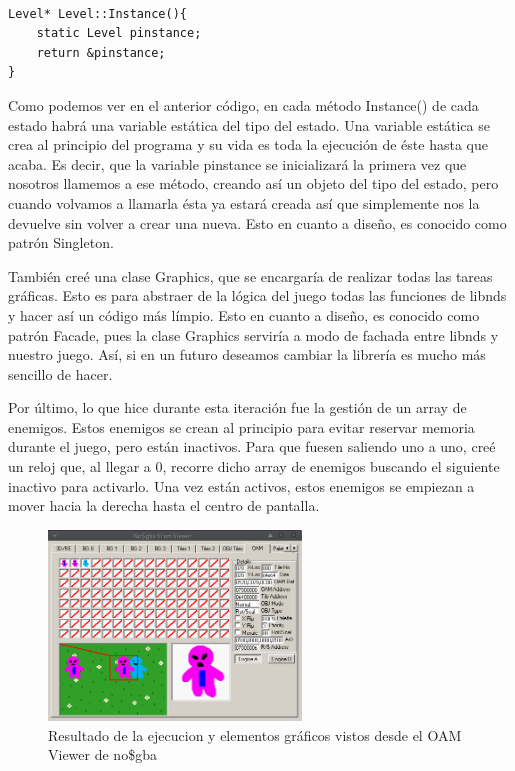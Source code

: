 \vspace{0.5cm}

\begin{lstlisting}[caption={Implementación del patrón Singleton}, label={code:singleton}]

Level* Level::Instance(){
	static Level pinstance;
	return &pinstance;
}

\end{lstlisting}

\vspace{0.5cm}

Como podemos ver en el anterior código, en cada método Instance() de cada estado habrá una variable estática del tipo del estado. Una variable estática se crea al principio del programa y su vida es toda la ejecución de éste hasta que acaba. Es decir, que la variable pinstance se inicializará la primera vez que nosotros llamemos a ese método, creando así un objeto del tipo del estado, pero cuando volvamos a llamarla ésta ya estará creada así que simplemente nos la devuelve sin volver a crear una nueva. Esto en cuanto a diseño, es conocido como patrón Singleton.

\vspace{0.5cm}

También creé una clase Graphics, que se encargaría de realizar todas las tareas gráficas. Esto es para abstraer de la lógica del juego todas las funciones de libnds y hacer así un código más límpio. Esto en cuanto a diseño, es conocido como patrón Facade, pues la clase Graphics serviría a modo de fachada entre libnds y nuestro juego. Así, si en un futuro deseamos cambiar la librería es mucho más sencillo de hacer.

\vspace{0.5cm}

Por último, lo que hice durante esta iteración fue la gestión de un array de enemigos. Estos enemigos se crean al principio para evitar reservar memoria durante el juego, pero están inactivos. Para que fuesen saliendo uno a uno, creé un reloj que, al llegar a 0, recorre dicho array de enemigos buscando el siguiente inactivo para activarlo. Una vez están activos, estos enemigos se empiezan a mover hacia la derecha hasta el centro de pantalla.

\vspace{0.5cm}

\begin{figure}[htbp]
\centering
  \includegraphics[width=0.6\textwidth]{archivos/borrar.png}
  \caption{Resultado de la ejecucion y elementos gráficos vistos desde el OAM Viewer de no\$gba}
  \label{fig:borrar}
\end{figure}

